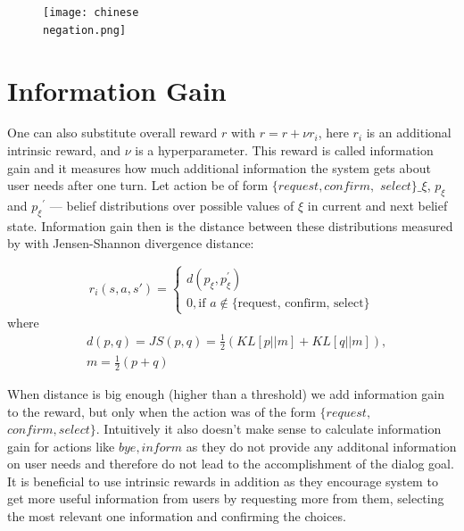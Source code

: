 \documentclass[12pt,titlepage,a4paper]{article}
\begin{document}
\begin{figure}
    \centering
    \texttt{[image: chinese\\ negation.png]}
    \caption{}
    \label{diag:negation}
\end{figure}

\pagebreak

\section{Information Gain}

One can also substitute overall reward $r$ with $r = r + \nu r_i$, here $r_i$ is an additional intrinsic reward, and $\nu$ is a hyperparameter. This reward is called information gain and it measures how much additional information the system gets about user needs after one turn. Let action be of form $\{request, confirm,$ $select\}\_\xi$, $p_{\xi}$ and ${p_{\xi}}^\prime$ --- belief distributions over possible values of $\xi$ in current and next belief state.  Informa\-tion gain then is the distance between these distributions measured by with Jensen-Shannon di\-vergence distance:

\begin{equation}
    r_i(s, a, s\prime) =
    \begin{cases}
        d(p_{\xi}, p_{\xi}^\prime) \\
        0, \text{if } a \notin \text{\{request, confirm, select\}}
    \end{cases}
\end{equation}
where
\begin{equation}
    \begin{aligned}
        &d(p, q) = JS(p,q) = \frac{1}{2}(KL[p||m] + KL[q||m]), \\
        &m = \frac{1}{2}(p + q)
    \end{aligned}
\end{equation}

When distance is big enough (higher than a threshold) we add infor\-mation gain to the reward, but only when the action was of the form $\{request,$ $ confirm, select\}$. Intuitively it also doesn't make sense to calculate infor\-mation gain for actions like $bye, inform$ as they do not provide any additonal infor\-mation on user needs and therefore do not lead to the accomplishment of the dialog goal. It is beneficial to use intrinsic rewards in addition as they encourage system to get more useful information from users by requesting more from them, selecting the most relevant one information and confirming the choices.
\end{document}
